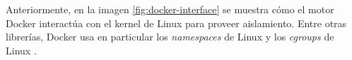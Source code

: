 Anteriormente, en la imagen \ref{fig:docker-interface} se muestra cómo el
motor Docker interactúa con el kernel de Linux para proveer aislamiento. Entre
otras librerías, Docker usa en particular los \textit{namespaces} de Linux
\autocite{LinuxNamespaces2021} y los \textit{cgroups} de Linux \autocite{Cgroups2021}.